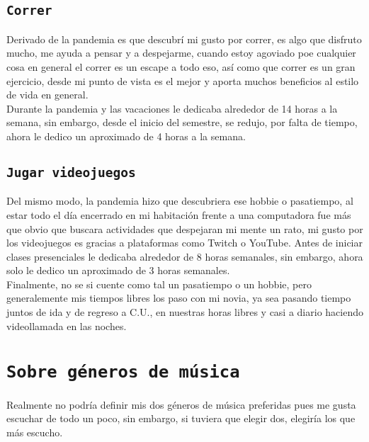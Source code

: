\documentclass[12pt, letterpaper]{article}
\begin{document}
    \subsection{\tt{\large{Correr}}}
    
    \small{
    Derivado de la pandemia es que descubrí mi gusto por correr, es algo que disfruto mucho, me ayuda a pensar y a despejarme, cuando estoy agoviado poe cualquier cosa en general el correr es un escape a todo eso, así como que correr es un gran ejercicio, desde mi punto de vista es el mejor y aporta muchos beneficios al estilo de vida en general.\\
    
    Durante la pandemia y las vacaciones le dedicaba alrededor de 14 horas a la semana, sin embargo, desde el inicio del semestre, se redujo, por falta de tiempo, ahora le dedico un aproximado de 4 horas a la semana. 
    }
    
    
    \subsection{\tt{\large{Jugar videojuegos}}}
    
    \small{
    Del mismo modo, la pandemia hizo que descubriera ese hobbie o pasatiempo, al estar todo el día encerrado en mi habitación frente a una computadora fue más que obvio que buscara actividades que despejaran mi mente un rato, mi gusto por los videojuegos es gracias a plataformas como Twitch o YouTube.
    Antes de iniciar clases presenciales le dedicaba alrededor de 8 horas semanales, sin embargo, ahora solo le dedico un aproximado de 3 horas semanales. \\ 
    
    
Finalmente, no se si cuente como tal un pasatiempo o un hobbie, pero generalemente mis tiempos libres los paso con mi novia, ya sea pasando tiempo juntos de ida y de regreso a C.U., en nuestras horas libres y casi a diario haciendo videollamada en las noches. \\
}
    
    

\section{\tt{\LARGE{Sobre géneros de música}}}

\normalsize{
Realmente no podría definir mis dos géneros de música preferidas pues me gusta escuchar de todo un poco, sin embargo, si tuviera que elegir dos, elegiría los que más escucho. 
}
\end{document}
